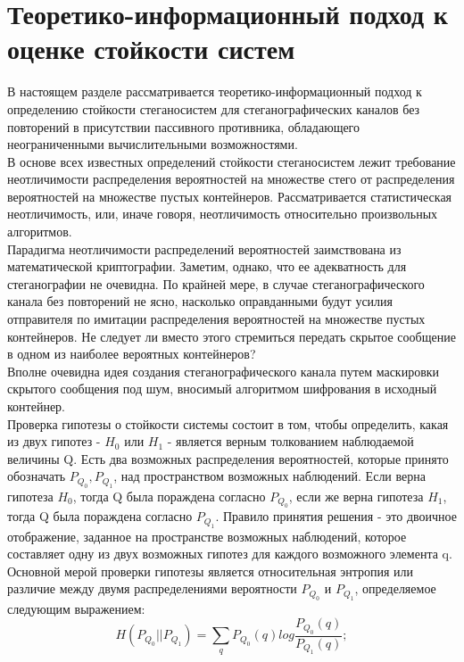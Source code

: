 \documentclass[a4paper,12pt]{article}
\theoremstyle{plain}
\begin{document}
\newpage

\section{Теоретико-информационный подход к оценке стойкости систем}
\vspace*{1cm}
В настоящем разделе рассматривается теоретико-информационный подход к определению стойкости
стеганосистем для стеганографических каналов без повторений в присутствии пассивного противника,
обладающего неограниченными вычислительными возможностями.\\
В основе всех известных определений стойкости стеганосистем лежит требование неотличимости
распределения вероятностей на множестве стего от распределения вероятностей на множестве пустых
контейнеров. Рассматривается статистическая неотличимость, или, иначе говоря,
неотличимость относительно произвольных алгоритмов. \\
Парадигма неотличимости распределений вероятностей заимствована из математической криптографии. Заметим, однако, что ее адекватность для стеганографии не очевидна. По крайней мере, в
случае стеганографического канала без повторений не ясно, насколько оправданными будут усилия
отправителя по имитации распределения вероятностей на множестве пустых контейнеров. Не следует
ли вместо этого стремиться передать скрытое сообщение в одном из наиболее вероятных контейнеров?\\
Вполне очевидна идея создания стеганографического канала путем
маскировки скрытого сообщения под шум, вносимый алгоритмом шифрования в исходный контейнер. \\
Проверка гипотезы о стойкости системы состоит в том, чтобы определить, какая из двух гипотез - $H_0$ или $H_1$ - является верным толкованием наблюдаемой величины Q. Есть два возможных распределения вероятностей, которые принято обозначать $P_{Q_0}, P_{Q_1}$, над пространством возможных наблюдений. Если верна гипотеза $H_0$, тогда Q была пораждена согласно $P_{Q_0}$, если же верна гипотеза $H_1$, тогда Q  была пораждена согласно $P_{Q_1}$. Правило принятия решения - это двоичное отображение, заданное на пространстве возможных наблюдений, которое составляет одну из двух возможных гипотез для каждого возможного элемента q.
Основной мерой проверки гипотезы является относительная энтропия или различие между двумя распределениями вероятности $P_{Q_0}$ и $P_{Q_1}$, определяемое следующим выражением:
	\begin{equation}
		H(P_{Q_0}||P_{Q_1}) = \sum_{q}P_{Q_0}(q)log\frac{P_{Q_0}(q)}{P_{Q_1}(q)};
	\end{equation}
\end{document}
